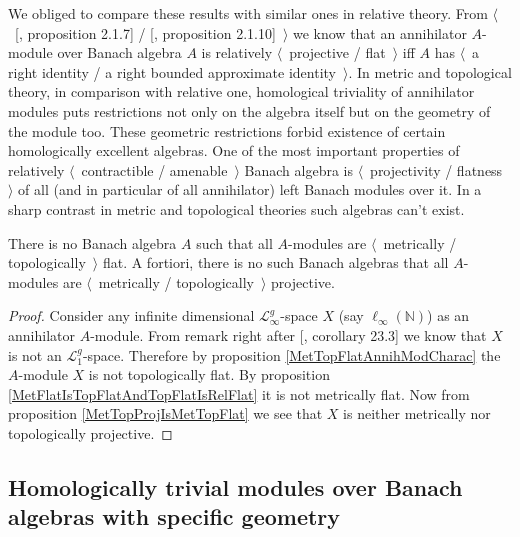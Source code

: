 We obliged to compare these results with similar ones in relative theory. From $\langle$~[\cite{RamsHomPropSemgroupAlg}, proposition 2.1.7] / [\cite{RamsHomPropSemgroupAlg}, proposition 2.1.10]~$\rangle$ we know that an annihilator $A$-module over Banach algebra $A$ is relatively $\langle$~projective / flat~$\rangle$ iff $A$ has $\langle$~a right identity / a right bounded approximate identity~$\rangle$.   
In metric and topological theory, in comparison with relative one, homological triviality of annihilator modules puts restrictions not only on the algebra itself but on the geometry of the module too. These geometric restrictions forbid existence of certain homologically excellent algebras. One of the most important properties of relatively $\langle$~contractible / amenable~$\rangle$ Banach algebra is $\langle$~projectivity / flatness~$\rangle$ of all (and in particular of all annihilator) left Banach modules over it. In a sharp contrast in metric and topological theories such algebras can't exist.

\begin{proposition} There is no Banach algebra $A$ such that all $A$-modules are  $\langle$~metrically / topologically~$\rangle$ flat. A fortiori, there is no such Banach algebras that all $A$-modules are $\langle$~metrically / topologically~$\rangle$ projective.
\end{proposition}
\begin{proof} Consider any infinite dimensional $\mathscr{L}_\infty^g$-space $X$ (say $\ell_\infty(\mathbb{N})$) as an annihilator $A$-module. From remark right after [\cite{DefFloTensNorOpId}, corollary 23.3] we know that $X$ is not an $\mathscr{L}_1^g$-space. Therefore by proposition \ref{MetTopFlatAnnihModCharac} the $A$-module $X$ is not topologically flat. By proposition \ref{MetFlatIsTopFlatAndTopFlatIsRelFlat} it is not metrically flat. Now from proposition \ref{MetTopProjIsMetTopFlat} we see that $X$ is neither metrically nor topologically projective.
\end{proof}


\subsection{Homologically trivial modules over Banach algebras with specific geometry}
\label{SubSectionHomologicallyTrivialModulesOverBanachAlgebrasWithSpecificGeometry}

